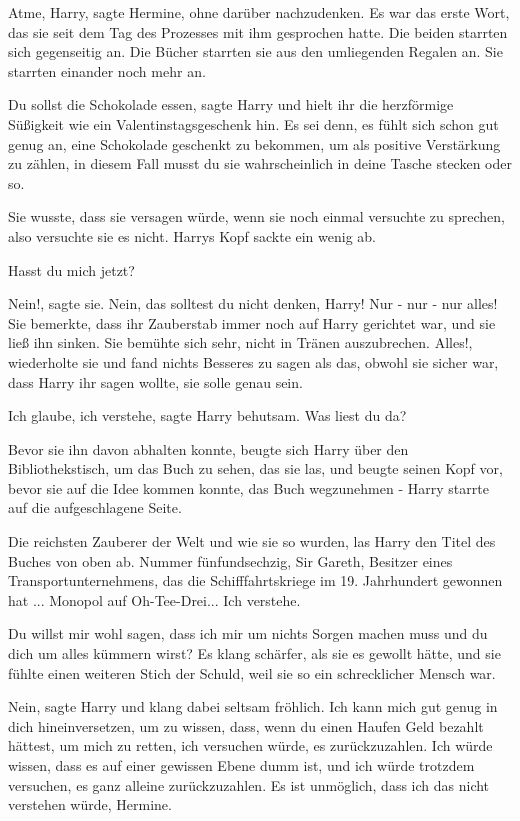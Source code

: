 \glqq{}Atme, Harry\grqq{}, sagte Hermine, ohne darüber nachzudenken. Es war das
erste Wort, das sie seit dem Tag des Prozesses mit ihm gesprochen hatte. Die
beiden starrten sich gegenseitig an. Die Bücher starrten sie aus den umliegenden
Regalen an. Sie starrten einander noch mehr an.

\glqq{}Du sollst die Schokolade essen\grqq{}, sagte Harry und hielt ihr die
herzförmige Süßigkeit wie ein Valentinstagsgeschenk hin. \glqq{}Es sei denn, es
fühlt sich schon gut genug an, eine Schokolade geschenkt zu bekommen, um als
positive Verstärkung zu zählen, in diesem Fall musst du sie wahrscheinlich in
deine Tasche stecken oder so.\grqq{}

Sie wusste, dass sie versagen würde, wenn sie noch einmal versuchte zu sprechen,
also versuchte sie es nicht. Harrys Kopf sackte ein wenig ab.

\glqq{}Hasst du mich jetzt?\grqq{}

\glqq{}Nein!\grqq{}, sagte sie. \glqq{}Nein, das solltest du nicht denken, Harry!
Nur - nur - nur alles!\grqq{} Sie bemerkte, dass ihr Zauberstab immer noch auf Harry
gerichtet war, und sie ließ ihn sinken. Sie bemühte sich sehr, nicht in Tränen
auszubrechen. \glqq{}Alles!\grqq{}, wiederholte sie und fand nichts Besseres zu
sagen als das, obwohl sie sicher war, dass Harry ihr sagen wollte, sie solle
genau sein.

\glqq{}Ich glaube, ich verstehe\grqq{}, sagte Harry behutsam. \glqq{}Was liest du
da?\grqq{}

Bevor sie ihn davon abhalten konnte, beugte sich Harry über den
Bibliothekstisch, um das Buch zu sehen, das sie las, und beugte seinen Kopf vor,
bevor sie auf die Idee kommen konnte, das Buch wegzunehmen - Harry starrte auf
die aufgeschlagene Seite.

\glqq{}Die reichsten Zauberer der Welt und wie sie so wurden\grqq{}, las Harry
den Titel des Buches von oben ab. \glqq{}Nummer fünfundsechzig, Sir Gareth,
Besitzer eines Transportunternehmens, das die Schifffahrtskriege im 19.
Jahrhundert gewonnen hat ... Monopol auf Oh-Tee-Drei... Ich verstehe.\grqq{}

\glqq{}Du willst mir wohl sagen, dass ich mir um nichts Sorgen machen muss und du
dich um alles kümmern wirst?\grqq{} Es klang schärfer, als sie es gewollt hätte,
und sie fühlte einen weiteren Stich der Schuld, weil sie so ein schrecklicher
Mensch war.

\glqq{}Nein\grqq{}, sagte Harry und klang dabei seltsam fröhlich. \glqq{}Ich kann
mich gut genug in dich hineinversetzen, um zu wissen, dass, wenn du einen Haufen
Geld bezahlt hättest, um mich zu retten, ich versuchen würde, es zurückzuzahlen.
Ich würde wissen, dass es auf einer gewissen Ebene dumm ist, und ich würde
trotzdem versuchen, es ganz alleine zurückzuzahlen. Es ist unmöglich, dass ich
das nicht verstehen würde, Hermine.\grqq{}

